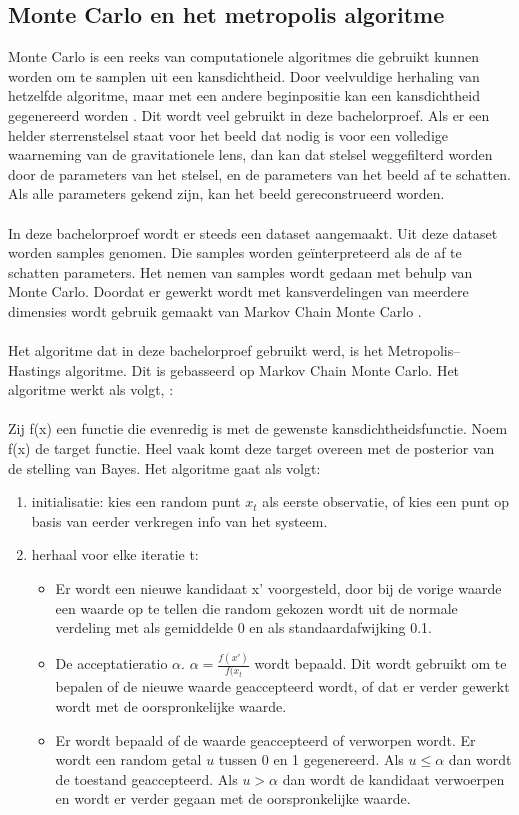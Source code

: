 \subsection{Monte Carlo en het metropolis algoritme}
Monte Carlo is een reeks van computationele algoritmes die gebruikt kunnen worden om te samplen uit een kansdichtheid. Door veelvuldige herhaling van hetzelfde algoritme, maar met een andere beginpositie kan een kansdichtheid gegenereerd worden \cite{wikipedia-bijdragers-2023}\cite{kenton-2023}. Dit wordt veel gebruikt in deze bachelorproef. Als er een helder sterrenstelsel staat voor het beeld dat nodig is voor een volledige waarneming van de gravitationele lens, dan kan dat stelsel weggefilterd worden door de parameters van het stelsel, en de parameters van het beeld af te schatten. Als alle parameters gekend zijn, kan het beeld gereconstrueerd worden.\\ \\
In deze bachelorproef wordt er steeds een dataset aangemaakt. Uit deze dataset worden samples genomen. Die samples worden geïnterpreteerd als de af te schatten parameters. Het nemen van samples wordt gedaan met behulp van Monte Carlo. Doordat er gewerkt wordt met kansverdelingen van meerdere dimensies wordt gebruik gemaakt van Markov Chain Monte Carlo \cite{unknown-author-2023-MCMC}.\\ \\
Het algoritme dat in deze bachelorproef gebruikt werd, is het Metropolis–Hastings algoritme. Dit is gebasseerd op Markov Chain Monte Carlo. Het algoritme werkt als volgt\cite{unknown-author-no-date}, \cite{thijssen-2007}:\\ \\
Zij f(x) een functie die evenredig is met de gewenste kansdichtheidsfunctie. Noem f(x) de target functie. Heel vaak komt deze target overeen met de posterior van de stelling van Bayes. Het algoritme gaat als volgt:
\begin{enumerate}
    \item initialisatie: kies een random punt $x_{t}$ als eerste observatie, of kies een punt op basis van eerder verkregen info van het systeem.
    \item herhaal voor elke iteratie t:
    \begin{itemize}
        \item Er wordt een nieuwe kandidaat x' voorgesteld, door bij de vorige waarde een waarde op te tellen die random gekozen wordt uit de normale verdeling met als gemiddelde 0 en als standaardafwijking 0.1.
        \item De acceptatieratio $\alpha$. $\alpha=\frac{f(x')}{f(x_{t}}$ wordt bepaald. Dit wordt gebruikt om te bepalen of de nieuwe waarde geaccepteerd wordt, of dat er verder gewerkt wordt met de oorspronkelijke waarde. 
        \item Er wordt bepaald of de waarde geaccepteerd of verworpen wordt. Er wordt een random getal $u$ tussen 0 en 1 gegenereerd. Als $u\leq\alpha$ dan wordt de toestand geaccepteerd. Als $u>\alpha$ dan wordt de kandidaat verwoerpen en wordt er verder gegaan met de oorspronkelijke waarde.
    \end{itemize}
\end{enumerate}
